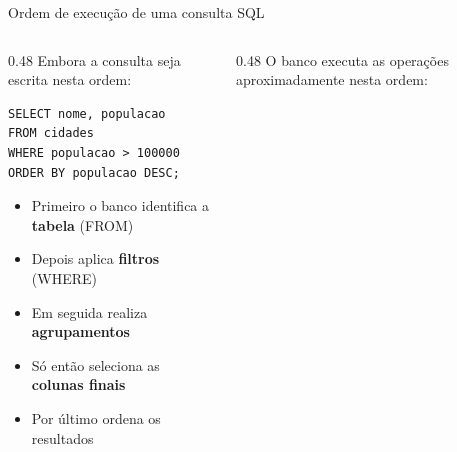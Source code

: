 \documentclass{beamer}
\begin{document}
\begin{frame}[fragile]{Ordem de execução de uma consulta SQL}
    
    
    \begin{columns}[t]
        \begin{column}[t]{0.48\textwidth}
            Embora a consulta seja escrita nesta ordem:
            \begin{verbatim}
SELECT nome, populacao
FROM cidades
WHERE populacao > 100000
ORDER BY populacao DESC;
            \end{verbatim}
            \begin{itemize}
                \item Primeiro o banco identifica a \textbf{tabela} (FROM)
                \item Depois aplica \textbf{filtros} (WHERE)
                \item Em seguida realiza \textbf{agrupamentos}
                \item Só então seleciona as \textbf{colunas finais}
                \item Por último ordena os resultados
            \end{itemize}
        \end{column}
        
        \begin{column}[t]{0.48\textwidth}
            O banco executa as operações aproximadamente nesta ordem:
            \begin{center}
                
                
            \end{center}
        \end{column}
    \end{columns}   
\end{frame}
\end{document}
